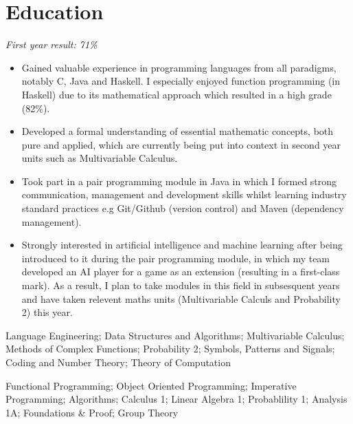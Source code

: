 \documentclass{cvclass}
\begin{document}
\address{Flat 7, 5-6 Clifton Down Road, Bristol, BS8 4AG}
\address{Email: sv17490@bristol.ac.uk, Mobile: 07908911995}
\address{Github: www.github.com/sollyvarcoe}
\section{Education}
\indent\indent\textit{First year result: 71\%}
\begin{itemize}
  \item Gained valuable experience in programming languages from all paradigms, notably C, Java and Haskell. I especially enjoyed function programming (in Haskell) due to its mathematical approach which resulted in a high grade (82\%).
  \item Developed a formal understanding of essential mathematic concepts, both pure and applied, which are currently being put into context in second year units such as Multivariable Calculus.
  \item Took part in a pair programming module in Java in which I formed strong communication, management and development skills whilst learning industry standard practices e.g Git/Github (version control) and Maven (dependency management).
  \item Strongly interested in artificial intelligence and machine learning after being introduced to it during the pair programming module, in which my team developed an AI player for a game as an extension (resulting in a first-class mark). As a result, I plan to take modules in this field in subsesquent years and have taken relevent maths units (Multivariable Calculs and Probability 2) this year.
\end{itemize}

  \begin{table}[h!]

     Language Engineering; Data Structures and Algorithms; Multivariable Calculus; Methods of Complex Functions;\newline
     Probability 2; Symbols, Patterns and Signals; Coding and Number Theory; Theory of Computation

  \end{table}


  \begin{table}[h!]

     Functional Programming; Object Oriented Programming; Imperative Programming; Algorithms; Calculus 1;\newline
      Linear Algebra 1; Probablility 1; Analysis 1A; Foundations \& Proof; Group Theory
  \end{table}
\end{document}
